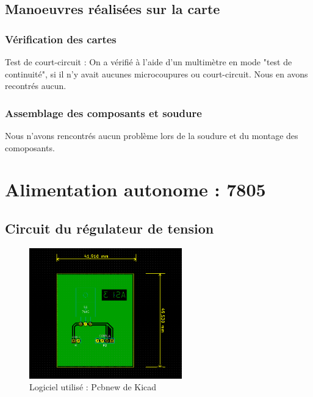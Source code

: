 \subsection{Manoeuvres réalisées sur la carte}
	\subsubsection{Vérification des cartes}
		Test de court-circuit : On a vérifié à l'aide d'un multimètre en mode "test de continuité", si il n'y avait aucunes microcoupures ou court-circuit. Nous en avons recontrés aucun.
	\subsubsection{Assemblage des composants et soudure}
	        Nous n'avons rencontrés aucun problème lors de la soudure et du montage des comoposants.
        

\newpage

\section{Alimentation autonome : 7805}
\subsection{Circuit du régulateur de tension}
\begin{figure}[H]
	\centering
	\includegraphics[width=250px]{images/PCB.png}
	\caption{Logiciel utilisé : Pcbnew de Kicad}
\end{figure}

